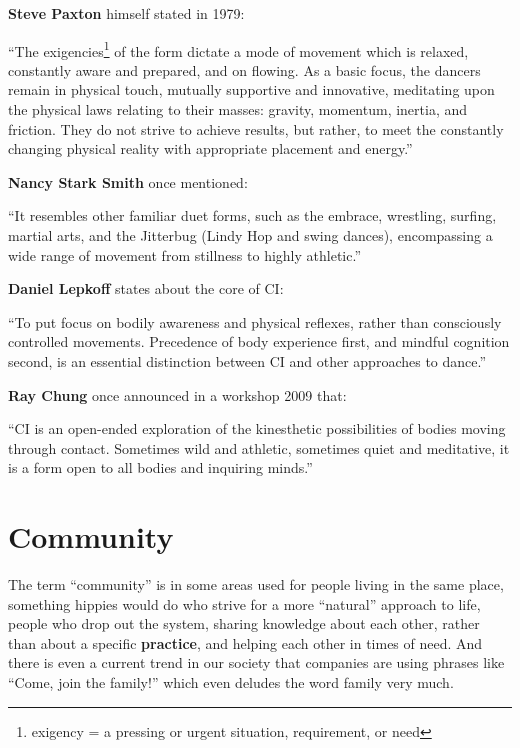 \textbf{Steve Paxton} himself stated in 1979:
\begin{displayquote}
	``The exigencies\footnote{exigency = a pressing or urgent situation, requirement, or need} of the form dictate a mode of movement which is relaxed, constantly aware and prepared, and on flowing.
	As a basic focus, the dancers remain in physical touch, mutually supportive and innovative, meditating upon the physical laws relating to their masses: gravity, momentum, inertia, and friction.
	They do not strive to achieve results, but rather, to meet the constantly changing physical reality with appropriate placement and energy.''
\end{displayquote}

\textbf{Nancy Stark Smith} once mentioned:
\begin{displayquote}
	``It resembles other familiar duet forms, such as the embrace, wrestling, surfing, martial arts, and the Jitterbug (Lindy Hop and swing dances), encompassing a wide range of movement from stillness to highly athletic.''
\end{displayquote}

\textbf{Daniel Lepkoff} states about the core of CI:
\begin{displayquote}
	``To put focus on bodily awareness and physical reflexes, rather than consciously controlled movements.
	Precedence of body experience first, and mindful cognition second, is an essential distinction between CI and other approaches to dance.''
\end{displayquote}

\textbf{Ray Chung} once announced in a workshop 2009 that:
\begin{displayquote}
	``CI is an open-ended exploration of the kinesthetic possibilities of bodies moving through contact.
	Sometimes wild and athletic, sometimes quiet and meditative, it is a form open to all bodies and inquiring minds.''
\end{displayquote}

\section{Community}\label{sec:community}

The term ``community'' is in some areas used for people living in the same place, something hippies would do who strive for a more ``natural'' approach to life, people who drop out the system, sharing knowledge about each other, rather than about a specific \textbf{practice}, and helping each other in times of need.
And there is even a current trend in our society that companies are using phrases like ``Come, join the family!'' which even deludes the word family very much.


